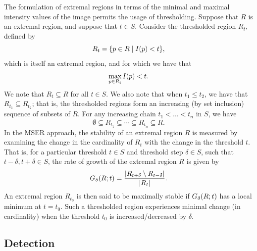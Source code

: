 \documentclass{article}
\begin{document}
The formulation of extremal regions in terms of the minimal and maximal
intensity values of the image permits the usage of thresholding.
Suppose that $R$ is an extremal region, and suppose that $t \in S$.
Consider the thresholded region $R_{t}$, defined by
\begin{equation}
  \label{eq:def-region-threshold}
  R_{t}
  =
  \lbrace
    p \in R
    \mid
    I(p) < t
  \rbrace
  ,
\end{equation}
which is itself an extremal region, and for which we have that
\begin{equation}
  \label{eq:def-region-threshold}
  \max_{p \in R_{t}} I(p)
  <
  t
  .
\end{equation}
We note that $R_{t} \subseteq R$ for all $t \in S$.
We also note that when $t_{1} \leq t_{2}$, we have that
$R_{t_{1}} \subseteq R_{t_{2}}$; that is, the thresholded regions form an
increasing (by set inclusion) sequence of subsets of $R$.
For any increasing chain $t_{1} < \dotsc < t_{n}$ in $S$, we have
\begin{equation}
  \label{eq:def-region-threshold-sequence}
  \emptyset
  \subseteq
  R_{t_{1}}
  \subseteq
  \dotsb
  \subseteq
  R_{t_{n}}
  \subseteq
  R
  .
\end{equation}
In the MSER approach, the stability of an extremal region $R$ is measured by
examining the change in the cardinality of $R_{t}$ with the change in the
threshold $t$.
That is, for a particular threshold $t \in S$ and threshold step $\delta \in S$,
such that $t - \delta, t + \delta \in S$, the rate of growth of the extremal
region $R$ is given by
\begin{equation}
  \label{eq:def-region-growth}
  G_{\delta}(R; t)
  =
  \frac
  {
    \lvert
      R_{t + \delta}
      \setminus
      R_{t - \delta}
    \rvert
  }
  {
    \lvert R_{t}\rvert
  }
  .
\end{equation}
An extremal region $R_{t_{0}}$ is then said to be maximally stable if
$G_{\delta}(R; t)$ has a local minimum at $t = t_{0}$.
Such a thresholded region experiences minimal change (in cardinality) when the
threshold $t_{0}$ is increased/decreased by $\delta$.

\subsection{Detection}
\label{sec:imp-detection}
\end{document}
